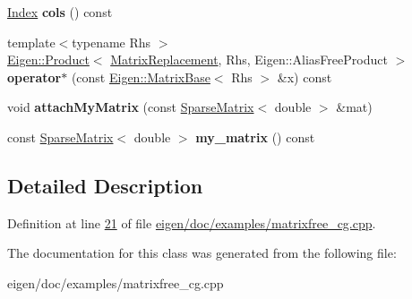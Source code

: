 \begin{DoxyCompactItemize}
\hyperlink{group___core___module_a554f30542cc2316add4b1ea0a492ff02}{Index} {\bfseries cols} () const
\item 
\mbox{\label{class_matrix_replacement_aa9bf2f9f11ec5d91576d2c6dbea78acb}} 
{\footnotesize template$<$typename Rhs $>$ }\\\hyperlink{group___core___module_class_eigen_1_1_product}{Eigen\+::\+Product}$<$ \hyperlink{class_matrix_replacement}{Matrix\+Replacement}, Rhs, Eigen\+::\+Alias\+Free\+Product $>$ {\bfseries operator$\ast$} (const \hyperlink{group___core___module_class_eigen_1_1_matrix_base}{Eigen\+::\+Matrix\+Base}$<$ Rhs $>$ \&x) const
\item 
\mbox{\label{class_matrix_replacement_a49a7f2bb559863898161cd450d58915a}} 
void {\bfseries attach\+My\+Matrix} (const \hyperlink{group___sparse_core___module_class_eigen_1_1_sparse_matrix}{Sparse\+Matrix}$<$ double $>$ \&mat)
\item 
\mbox{\label{class_matrix_replacement_a90fb4c6ce766a70ddcff42532359d4b8}} 
const \hyperlink{group___sparse_core___module_class_eigen_1_1_sparse_matrix}{Sparse\+Matrix}$<$ double $>$ {\bfseries my\+\_\+matrix} () const
\end{DoxyCompactItemize}


\subsection{Detailed Description}


Definition at line \hyperlink{eigen_2doc_2examples_2matrixfree__cg_8cpp_source_l00021}{21} of file \hyperlink{eigen_2doc_2examples_2matrixfree__cg_8cpp_source}{eigen/doc/examples/matrixfree\+\_\+cg.\+cpp}.



The documentation for this class was generated from the following file\+:\begin{DoxyCompactItemize}
\item 
eigen/doc/examples/matrixfree\+\_\+cg.\+cpp\end{DoxyCompactItemize}
